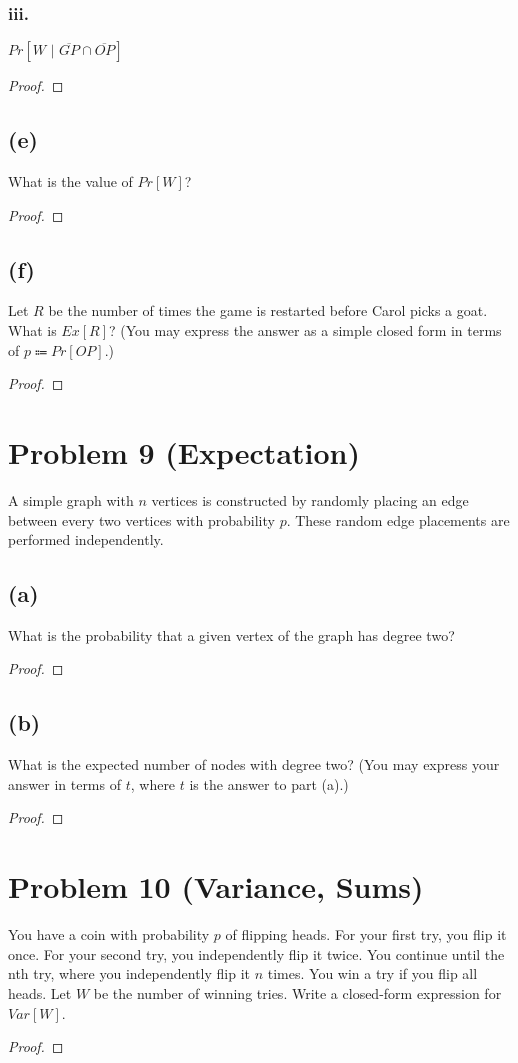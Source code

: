 \documentclass[14pt]{extarticle}
\begin{document}
\subsubsection{iii.}
$Pr[W \,\,|\,\, \overline{GP}\cap \overline{OP}]$
\begin{proof}
\end{proof}

\subsection{(e)}
What is the value of $Pr[W]$?
\begin{proof}
\end{proof}

\subsection{(f)}
Let $R$ be the number of times the game is restarted before Carol picks a goat. What is $Ex[R]$? (You may express the answer as a simple closed form in terms of $p \Coloneqq Pr[OP]$.)
\begin{proof}
\end{proof}

\section{Problem 9 (Expectation)}
A simple graph with $n$ vertices is constructed by randomly placing an edge between every two vertices with probability $p$. These random edge placements are performed independently.
\subsection{(a)}
What is the probability that a given vertex of the graph has degree two?
\begin{proof}
\end{proof}

\subsection{(b)}
What is the expected number of nodes with degree two? (You may express your answer in terms of $t$, where $t$ is the answer to part (a).)
\begin{proof}
\end{proof}

\section{Problem 10 (Variance, Sums)}
You have a coin with probability $p$ of flipping heads. For your first try, you flip it once. For your second try, you independently flip it twice. You continue until the nth try, where you independently flip it $n$ times. You win a try if you flip all heads. Let $W$ be the number of winning tries. Write a closed-form expression for $Var[W]$.
\begin{proof}
\end{proof}
\end{document}
